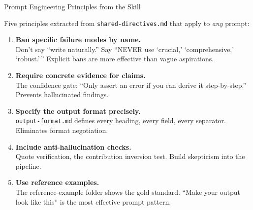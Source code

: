 \documentclass[10pt,english,aspectratio=169]{beamer}
\begin{document}
\begin{frame}{Prompt Engineering Principles from the Skill}

Five principles extracted from \texttt{shared-directives.md} that apply to \emph{any} prompt:

\vspace{0.3cm}
\begin{enumerate}
    \item \textbf{Ban specific failure modes by name.}\\
    Don't say ``write naturally.'' Say ``NEVER use `crucial,' `comprehensive,' `robust.'\,'' Explicit bans are more effective than vague aspirations.

    \vspace{0.15cm}
    \item \textbf{Require concrete evidence for claims.}\\
    The confidence gate: ``Only assert an error if you can derive it step-by-step.'' Prevents hallucinated findings.

    \vspace{0.15cm}
    \item \textbf{Specify the output format precisely.}\\
    \texttt{output-format.md} defines every heading, every field, every separator. Eliminates format negotiation.

    \vspace{0.15cm}
    \item \textbf{Include anti-hallucination checks.}\\
    Quote verification, the contribution inversion test. Build skepticism into the pipeline.

    \vspace{0.15cm}
    \item \textbf{Use reference examples.}\\
    The reference-example folder shows the gold standard. ``Make your output look like this'' is the most effective prompt pattern.
\end{enumerate}

\end{frame}
\end{document}
